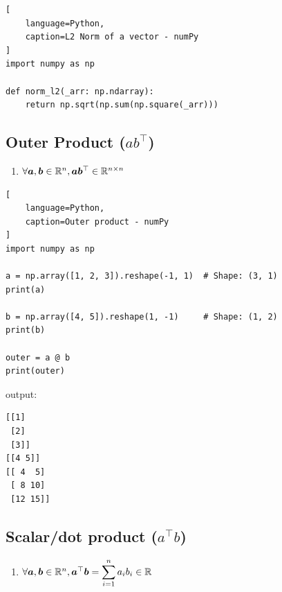 \begin{lstlisting}[
    language=Python,
    caption=L2 Norm of a vector - numPy
]
import numpy as np

def norm_l2(_arr: np.ndarray):
    return np.sqrt(np.sum(np.square(_arr)))

\end{lstlisting}








\subsection{Outer Product ($ab^\top$) }

\begin{enumerate}
    \item $\forall \bm{a}, \bm{b} \in \mathbb{R}^n, \bm{ab}^\top \in \mathbb{R}^{n\times n}$
    \hfill \cite{mfml/book/mml/Deisenroth-Faisal-Ong}
    
\end{enumerate}


\begin{lstlisting}[
    language=Python,
    caption=Outer product - numPy
]
import numpy as np

a = np.array([1, 2, 3]).reshape(-1, 1)  # Shape: (3, 1)
print(a)

b = np.array([4, 5]).reshape(1, -1)     # Shape: (1, 2)
print(b)

outer = a @ b
print(outer)
\end{lstlisting}

output:
\begin{lstlisting}
[[1]
 [2]
 [3]]
[[4 5]]
[[ 4  5]
 [ 8 10]
 [12 15]]
\end{lstlisting}










\subsection{Scalar/dot product ($a^\top b$)}


\begin{enumerate}
    \item $
        \forall \bm{a}, \bm{b} \in \mathbb{R}^n, 
        \bm{a}^\top \bm{b} = \displaystyle\sum^n_{i=1} a_i b_i \in \mathbb{R}    
    $
    \hfill \cite{mfml/book/mml/Deisenroth-Faisal-Ong}
    
\end{enumerate}



